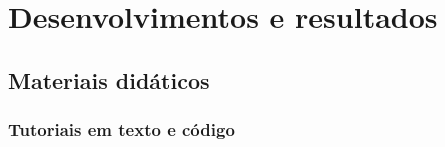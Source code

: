 \chapter{Desenvolvimentos e resultados} %
\label{cap:resultados} %

\section{Materiais didáticos}

\subsection{Tutoriais em texto e código}

